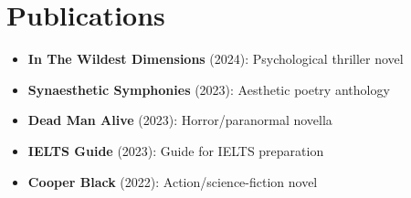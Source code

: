 \documentclass[10pt,a4paper]{article}
\begin{document}
\section*{Publications}
\begin{itemize}
    \item \textbf{In The Wildest Dimensions} (2024): Psychological thriller novel
    \item \textbf{Synaesthetic Symphonies} (2023): Aesthetic poetry anthology
    \item \textbf{Dead Man Alive} (2023): Horror/paranormal novella
    \item \textbf{IELTS Guide} (2023): Guide for IELTS preparation
    \item \textbf{Cooper Black} (2022): Action/science-fiction novel
\end{itemize}
\end{document}
